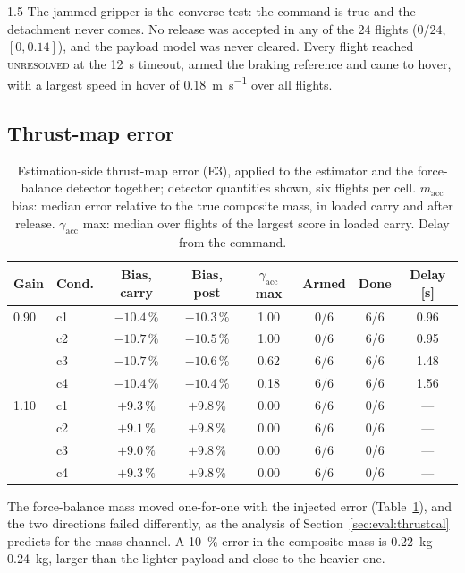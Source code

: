 \begin{spacing}{1.5}
The jammed gripper is the converse test: the command is true and the
detachment never comes. No release was accepted in any of the $24$ flights
($0/24$, $[0, 0.14]$), and the payload model was never cleared. Every flight
reached \textsc{unresolved} at the \SI{12}{\second} timeout, armed the braking
reference and came to hover, with a largest speed in hover of
\SI{0.18}{\meter\per\second} over all flights.

\subsection{Thrust-map error}\label{sec:eval:camp:thrust}

\begin{table}[ht]
\centering
\caption[Estimation-side thrust-map error (E3)]{Estimation-side thrust-map
error (E3), applied to the estimator and the force-balance detector together;
detector quantities shown, six flights per cell. $m_{\mathrm{acc}}$
bias: median error relative to the true composite mass, in loaded carry and
after release. $\gamma_{\mathrm{acc}}$ max: median over flights of the largest
score in loaded carry. Delay from the command.}
\label{tab:camp-thrust}
\small
\begin{tabular}{@{}l l c c c c c c@{}}
\toprule
\textbf{Gain} & \textbf{Cond.} & \textbf{Bias, carry} & \textbf{Bias, post} &
$\gamma_{\mathrm{acc}}$ \textbf{max} & \textbf{Armed} & \textbf{Done} &
\textbf{Delay [s]} \\
\midrule
0.90 & c1 & $-10.4\,\%$ & $-10.3\,\%$ & 1.00 & 0/6 & 6/6 & 0.96 \\
     & c2 & $-10.7\,\%$ & $-10.5\,\%$ & 1.00 & 0/6 & 6/6 & 0.95 \\
     & c3 & $-10.7\,\%$ & $-10.6\,\%$ & 0.62 & 6/6 & 6/6 & 1.48 \\
     & c4 & $-10.4\,\%$ & $-10.4\,\%$ & 0.18 & 6/6 & 6/6 & 1.56 \\
\midrule
1.10 & c1 & $+9.3\,\%$ & $+9.8\,\%$ & 0.00 & 6/6 & 0/6 & --- \\
     & c2 & $+9.1\,\%$ & $+9.8\,\%$ & 0.00 & 6/6 & 0/6 & --- \\
     & c3 & $+9.0\,\%$ & $+9.8\,\%$ & 0.00 & 6/6 & 0/6 & --- \\
     & c4 & $+9.3\,\%$ & $+9.8\,\%$ & 0.00 & 6/6 & 0/6 & --- \\
\bottomrule
\end{tabular}
\end{table}

The force-balance mass moved one-for-one with the injected error
(Table~\ref{tab:camp-thrust}), and the two directions failed differently, as
the analysis of Section~\ref{sec:eval:thrustcal} predicts for the mass channel.
A \SI{10}{\percent} error in the composite mass is \SIrange{0.22}{0.24}{\kg},
larger than the lighter payload and close to the heavier one.


\end{spacing}

